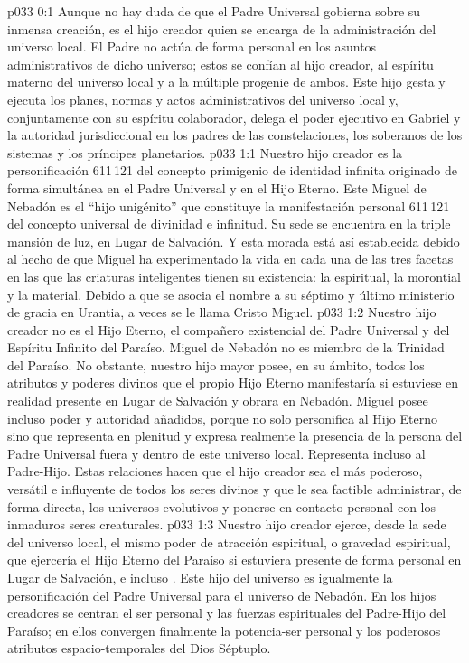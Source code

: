 \author{Jefe de los arcángeles}
\vs p033 0:1 Aunque no hay duda de que el Padre Universal gobierna sobre su inmensa creación, es el hijo creador quien se encarga de la administración del universo local. El Padre no actúa de forma personal en los asuntos administrativos de dicho universo; estos se confían al hijo creador, al espíritu materno del universo local y a la múltiple progenie de ambos. Este hijo gesta y ejecuta los planes, normas y actos administrativos del universo local y, conjuntamente con su espíritu colaborador, delega el poder ejecutivo en Gabriel y la autoridad jurisdiccional en los padres de las constelaciones, los soberanos de los sistemas y los príncipes planetarios.
\vs p033 1:1 Nuestro hijo creador es la personificación 611\,121 del concepto primigenio de identidad infinita originado de forma simultánea en el Padre Universal y en el Hijo Eterno. Este Miguel de Nebadón es el “hijo unigénito” que constituye la manifestación personal 611\,121 del concepto universal de divinidad e infinitud. Su sede se encuentra en la triple mansión de luz, en Lugar de Salvación. Y esta morada está así establecida debido al hecho de que Miguel ha experimentado la vida en cada una de las tres facetas en las que las criaturas inteligentes tienen su existencia: la espiritual, la morontial y la material. Debido a que se asocia el nombre a su séptimo y último ministerio de gracia en Urantia, a veces se le llama Cristo Miguel.
\vs p033 1:2 Nuestro hijo creador no es el Hijo Eterno, el compañero existencial del Padre Universal y del Espíritu Infinito del Paraíso. Miguel de Nebadón no es miembro de la Trinidad del Paraíso. No obstante, nuestro hijo mayor posee, en su ámbito, todos los atributos y poderes divinos que el propio Hijo Eterno manifestaría si estuviese en realidad presente en Lugar de Salvación y obrara en Nebadón. Miguel posee incluso poder y autoridad añadidos, porque no solo personifica al Hijo Eterno sino que representa en plenitud y expresa realmente la presencia de la persona del Padre Universal fuera y dentro de este universo local. Representa incluso al Padre\hyp{}Hijo. Estas relaciones hacen que el hijo creador sea el más poderoso, versátil e influyente de todos los seres divinos y que le sea factible administrar, de forma directa, los universos evolutivos y ponerse en contacto personal con los inmaduros seres creaturales.
\vs p033 1:3 Nuestro hijo creador ejerce, desde la sede del universo local, el mismo poder de atracción espiritual, o gravedad espiritual, que ejercería el Hijo Eterno del Paraíso si estuviera presente de forma personal en Lugar de Salvación, e incluso . Este hijo del universo es igualmente la personificación del Padre Universal para el universo de Nebadón. En los hijos creadores se centran el ser personal y las fuerzas espirituales del Padre\hyp{}Hijo del Paraíso; en ellos convergen finalmente la potencia\hyp{}ser personal y los poderosos atributos espacio\hyp{}temporales del Dios Séptuplo.
